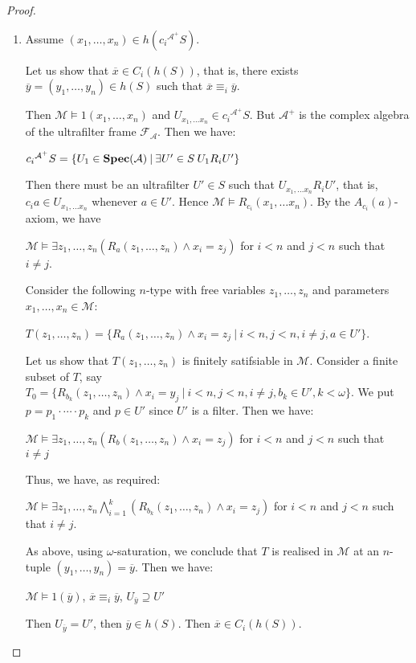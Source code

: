 \documentclass{article}
\theoremstyle{defin}
\theoremstyle{theorem}
\theoremstyle{claim}
\theoremstyle{prop}
\theoremstyle{lemma}
\theoremstyle{fact}
\theoremstyle{remark}
\theoremstyle{ex}
\theoremstyle{col}
\theoremstyle{question}
\begin{document}
\begin{proof}
$ $

\begin{enumerate}
\item Assume $(x_1, \dots, x_n) \in h(c_i{^{\mathcal{A}^{+}}} S)$.

Let us show that $\overline{x} \in C_i (h(S))$, that is, there exists $\overline{y} = (y_1, \dots, y_n) \in h(S)$ such that $\overline{x} \equiv_{i} \overline{y}$.

Then $\mathcal{M} \models 1(x_1, \dots, x_n)$ and $U_{x_1, \dots x_n} \in c_i{^{\mathcal{A}^{+}}} S$. 
But $\mathcal{A}^{+}$ is the complex algebra of the ultrafilter frame $\mathcal{F}_{\mathcal{A}}$.
Then we have:
\begin{center}
$c_i{^{\mathcal{A}^{+}}} S = \{ U_1 \in {\bf Spec}(\mathcal{A}) \: | \: \exists U' \in S  \: U_1 R_{i} U' \}$
\end{center}
Then there must be an ultrafilter $U' \in S$ such that $U_{x_1, \dots x_n} R_{i} U'$, that is, $c_i a \in U_{x_1, \dots x_n}$ whenever $a \in U'$.
Hence $\mathcal{M} \models R_{c_i}(x_1, \dots x_n)$. By the $A_{c_i}(a)$-axiom, we have
\begin{center}
$\mathcal{M} \models \exists z_1, \dots, z_n (R_a(z_1, \dots, z_n) \land x_i = z_j)$ for $i < n$ and $j < n$ such that $i \neq j$.
\end{center}
Consider the following $n$-type with free variables $z_1, \dots, z_n$ and parameters $x_1, \dots, x_n \in \mathcal{M}$:
\begin{center}
$T(z_1, \dots, z_n) = \{ R_a(z_1, \dots, z_n) \land x_i = z_j \: | \: i < n, j < n, i \neq j, a \in U' \}$.
\end{center}
Let us show that $T(z_1, \dots, z_n)$ is finitely satifsiable in $\mathcal{M}$.
Consider a finite subset of $T$, say $T_0 = \{ R_{b_k}(z_1, \dots, z_n) \land x_i = y_j \: | \: i < n, j < n, i \neq j, b_k \in U', k < \omega \}$.
We put $p = p_1 \cdot \cdots \cdot p_k$ and $p \in U'$ since $U'$ is a filter. Then we have:
\begin{center}
$\mathcal{M} \models \exists z_1, \dots, z_n (R_b(z_1, \dots, z_n) \land x_i = z_j)$ for $i < n$ and $j < n$ such that $i \neq j$
\end{center}
Thus, we have, as required:
\begin{center}
$\mathcal{M} \models \exists z_1, \dots, z_n \bigwedge \limits_{i = 1}^{k} (R_{b_k}(z_1, \dots, z_n) \land x_i = z_j)$ for $i < n$ and $j < n$ such that $i \neq j$.
\end{center}
As above, using $\omega$-saturation, we conclude that $T$ is realised in $\mathcal{M}$ at an $n$-tuple $(y_1, \dots, y_n) = \overline{y}$.
Then we have:
\begin{center}
$\mathcal{M} \models 1(\overline{y})$, $\overline{x} \equiv_i \overline{y}$, $U_{\overline{y}} \supseteq U'$
\end{center}
Then $U_{\overline{y}} = U'$, then $\overline{y} \in h(S)$. Then $\overline{x} \in C_i (h (S))$.


\end{enumerate}
\end{proof}
\end{document}
